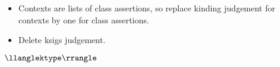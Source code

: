 \begin{itemize}
    \item Contexts are lists of class assertions, so replace kinding judgement for contexts by one for class assertions.
    \item Delete ksigs judgement.
\end{itemize}


$\jdgmtname{ktype}$